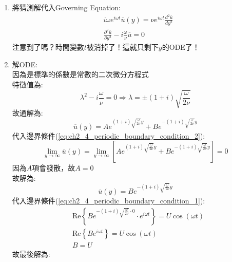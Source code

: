 \documentclass[../main.tex]{subfiles}
\begin{document}
\begin{itemize}
\begin{enumerate}
\begin{equation}
      u_x(y,t) = \text{Re}\left\{\overline{u}(y) e^{i\omega t}
      \right\}
    \end{equation}
    P.S. Re代表取實部，$\overline{u}(y)$代表這是個複數函數\\
    由於一直加Re會很干擾，所以最後再取實部就好
    \item 將猜測解代入Governing Equation:
    \begin{align}
      &i\omega e^{i\omega t} \overline{u}(y) = \nu e^{i\omega t} \frac{d^2 \overline{u}}{dy^2} \nonumber\\
      &\boxed{\frac{\partial^2 \overline{u}}{\partial y^2} - i\frac{\omega}{\nu} \overline{u} = 0} 
    \end{align}
    注意到了嗎？時間變數$t$被消掉了！這就只剩下$y$的ODE了！
    \item 解ODE:\\
    因為是標準的係數是常數的二次微分方程式\\
    特徵值為:
    \begin{equation}
      \lambda^2 - i\frac{\omega}{\nu} = 0 \Rightarrow \lambda = \pm (1+i)\sqrt{\frac{\omega}{2\nu}}
    \end{equation}
    故通解為:
    \begin{equation}
      \overline{u}(y) = A e^{(1+i)\sqrt{\frac{\omega}{2\nu}}y} + B e^{-(1+i)\sqrt{\frac{\omega}{2\nu}}y}
    \end{equation}
    代入邊界條件(\ref{eq:ch2_4_periodic_boundary_condition_2}):
    \begin{equation}
      \lim_{y\to\infty} \overline{u}(y) = \lim_{y\to\infty} \left[
        A e^{(1+i)\sqrt{\frac{\omega}{2\nu}}y} + B e^{-(1+i)\sqrt{\frac{\omega}{2\nu}}y}
      \right] = 0
    \end{equation}
    因為$A$項會發散，故$A=0$\\
    故解為:
    \begin{equation}
      \overline{u}(y) = B e^{-(1+i)\sqrt{\frac{\omega}{2\nu}}y}
    \end{equation}
    代入邊界條件(\ref{eq:ch2_4_periodic_boundary_condition_1}):
    \begin{align}
      & \text{Re}\left\{
        B e^{-(1+i)\sqrt{\frac{\omega}{2\nu}} \cdot 0} \cdot e^{i\omega t}
      \right\} = U \cos(\omega t) \nonumber\\
      & \text{Re}\left\{
        B e^{i\omega t}
      \right\} = U \cos(\omega t) \nonumber\\
      & B = U
    \end{align}
    故最後解為:
    \begin{equation}

\end{equation}
\end{enumerate}
\end{itemize}
\end{document}
